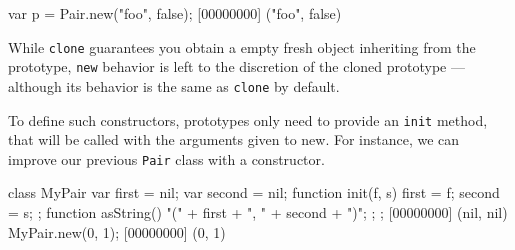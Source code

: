 \begin{urbiscript}
var p = Pair.new("foo", false);
[00000000] ("foo", false)
\end{urbiscript}

While \lstinline{clone} guarantees you obtain a empty fresh object
inheriting from the prototype, \lstinline{new} behavior is left to the
discretion of the cloned prototype --- although its behavior is the
same as \lstinline{clone} by default.

To define such constructors, prototypes only need to provide an
\lstinline{init} method, that will be called with the arguments given to
new. For instance, we can improve our previous \lstinline{Pair} class
with a constructor.

\begin{urbiscript}
class MyPair
{
  var first = nil;
  var second = nil;
  function init(f, s) { first = f;   second = s;  };
  function asString() { "(" + first + ", " + second + ")"; };
};
[00000000] (nil, nil)
MyPair.new(0, 1);
[00000000] (0, 1)
\end{urbiscript}


